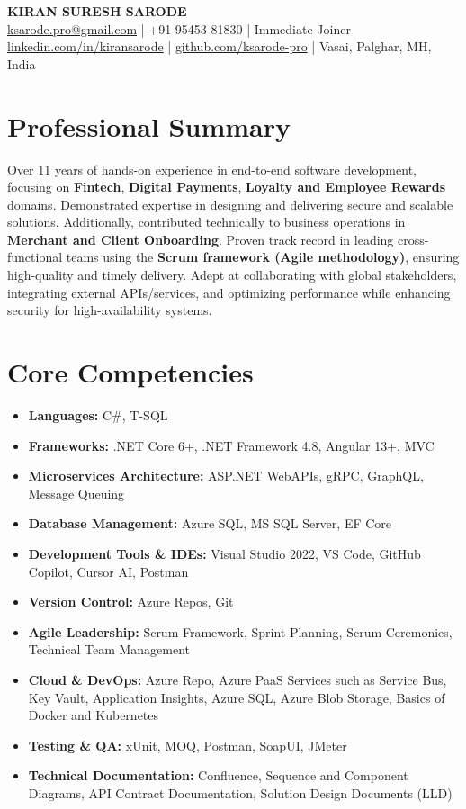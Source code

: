 \documentclass[12pt,a4paper]{article}
\begin{document}
    \begin{center}
    {\Large \textbf{KIRAN SURESH SARODE}}\\[3pt]
    \normalsize
    \href{mailto:ksarode.pro@gmail.com}{ksarode.pro@gmail.com}  | +91 95453 81830 | Immediate Joiner
    \href{https://www.linkedin.com/in/kiransarode}{linkedin.com/in/kiransarode} | 
    \href{https://github.com/ksarode-pro}{github.com/ksarode-pro}  | 
    Vasai, Palghar, MH, India
\end{center}
\section*{Professional Summary}
Over 11 years of hands-on experience in end-to-end software development, focusing on \textbf{Fintech}, \textbf{Digital Payments}, \textbf{Loyalty and Employee Rewards} domains. Demonstrated expertise in designing and delivering secure and scalable solutions. Additionally, contributed technically to business operations in \textbf{Merchant and Client Onboarding}. Proven track record in leading cross-functional teams using the \textbf{Scrum framework (Agile methodology)}, ensuring high-quality and timely delivery. Adept at collaborating with global stakeholders, integrating external APIs/services, and optimizing performance while enhancing security for high-availability systems.

\section*{Core Competencies}
\begin{itemize}
    \item \textbf{Languages:} C\#, T-SQL
    \item \textbf{Frameworks:} .NET Core 6+, .NET Framework 4.8, Angular 13+, MVC
    \item \textbf{Microservices Architecture:} ASP.NET WebAPIs, gRPC,  GraphQL, Message Queuing
    \item \textbf{Database Management:} Azure SQL, MS SQL Server, EF Core
    \item \textbf{Development Tools \& IDEs:} Visual Studio 2022, VS Code, GitHub Copilot, Cursor AI, Postman
    \item \textbf{Version Control:} Azure Repos, Git
    \item \textbf{Agile Leadership:} Scrum Framework, Sprint Planning, Scrum Ceremonies, Technical Team Management
    \item \textbf{Cloud \& DevOps:} Azure Repo, Azure PaaS Services such as Service Bus, Key Vault, Application Insights, Azure SQL, Azure Blob Storage, Basics of Docker and Kubernetes
    \item \textbf{Testing \& QA:} xUnit, MOQ, Postman, SoapUI, JMeter
    \item \textbf{Technical Documentation:} Confluence, Sequence and Component Diagrams, API Contract Documentation, Solution Design Documents (LLD)
\end{itemize}
\end{document}
